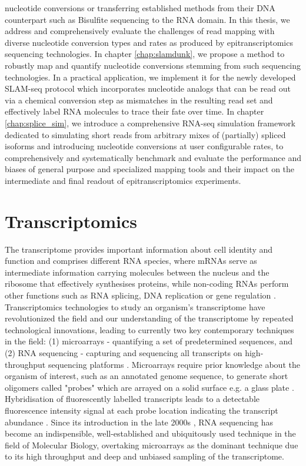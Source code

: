 nucleotide conversions or transferring established methods from their DNA counterpart such as Bisulfite sequencing \citep{Rieder2016} to the RNA domain. 
In this thesis, we address and comprehensively evaluate the challenges of read mapping with diverse nucleotide conversion types and rates as produced by epitranscriptomics sequencing technologies. In chapter \ref{chap:slamdunk}, we propose a method to robustly map and quantify nucleotide conversions stemming from such sequencing technologies. In a practical application, we implement it for the newly developed SLAM-seq protocol \citep{Herzog2017} which incorporates nucleotide analogs that can be read out via a chemical conversion step as mismatches in the resulting read set and effectively label RNA molecules to trace their fate over time. In chapter \ref{chap:splice_sim}, we introduce a comprehensive RNA-seq simulation framework dedicated to simulating short reads from arbitrary mixes of (partially) spliced isoforms and introducing nucleotide conversions at user configurable rates, to comprehensively and systematically benchmark and evaluate the performance and biases of general purpose and specialized mapping tools and their impact on the intermediate and final readout of epitranscriptomics experiments.

\section{Transcriptomics}
The transcriptome provides important information about cell identity and function \citep{JIMENEZCHILLARON201481} and comprises different RNA species, where \mbox{mRNAs} serve as intermediate information carrying molecules between the nucleus and the ribosome that effectively synthesises proteins, while non-coding RNAs perform other functions such as RNA splicing, DNA replication or gene regulation \citep{Lowe2017}.
Transcriptomics technologies to study an organism's transcriptome have revolutionized the field and our understanding of the transcriptome by repeated technological innovations, leading to currently two key contemporary techniques in the field: (1) microarrays - quantifying a set of predetermined sequences, and (2) RNA sequencing - capturing and sequencing all transcripts on high-throughput sequencing platforms \citep{Lowe2017}. Microarrays require prior knowledge about the organism of interest, such as an annotated genome sequence, to generate short oligomers called "probes" which are arrayed on a solid surface e.g. a glass plate \citep{Romanov2014}. Hybridisation of fluorescently labelled transcripts leads to a detectable fluorescence intensity signal at each probe location indicating the transcript abundance \citep{BarbulovicNad2006}.
Since its introduction in the late 2000s \citep{Mortazavi2008,Marioni2008}, RNA sequencing has become an indispensible, well-established and ubiquitously used technique in the field of Molecular Biology, overtaking microarrays as the dominant technique \citep{Su2014} due to its high throughput and deep and unbiased sampling of the transcriptome.

